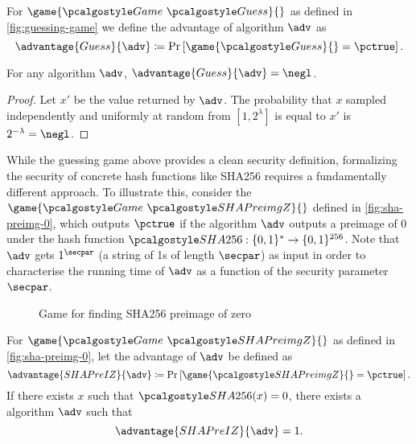 \begin{definition}
  For $\game{\Game~\algo{Guess}}{}$ as defined in \autoref{fig:guessing-game} we define the advantage of algorithm $\adv$ as
 \[
  \advantage{Guess}{\adv} \defeq \pr{\game{\algo{Guess}}{} = \pctrue}.
 \]
\end{definition}

\begin{proposition}\label{prop:guessing-game}
  For any algorithm $\adv$, $\advantage{Guess}{\adv} = \negl$.
\end{proposition}

\begin{proof}
Let $x'$ be the value returned by $\adv$.
The probability that $x$ sampled independently and uniformly at random from $[1, 2^\lambda]$ is equal to $x'$ is $2^{-\lambda} = \negl$.
\end{proof}

While the guessing game above provides a clean security definition, formalizing the security of concrete hash functions like SHA256 requires a fundamentally different approach.
To illustrate this, consider the $\game{\Game~\algo{SHAPreimgZ}}{}$ defined in \autoref{fig:sha-preimg-0}, which outputs $\pctrue$ if the algorithm $\adv$ outputs a preimage of 0 under the hash function $\algo{SHA256}: \{0, 1\}^* \rightarrow \{0, 1\}^{256}$.
Note that $\adv$ gets $1^{\secpar}$ (a string of 1s of length $\secpar$) as input in order to characterise the running time of $\adv$ as a function of the security parameter $\secpar$.

\begin{figure}[tbhp]
  \begin{center}
    \begin{tcolorbox}[width=5cm]
      \begin{pchstack}[center]
      \end{pchstack}
    \end{tcolorbox}
  \end{center}
  \caption{Game for finding SHA256 preimage of zero \label{fig:sha-preimg-0}}
\end{figure}

\begin{proposition}\label{prop:sha-preimg-z}
 For $\game{\Game~\algo{SHAPreimgZ}}{}$ as defined in \autoref{fig:sha-preimg-0}, let the advantage of $\adv$ be defined as
 \[
  \advantage{SHAPreIZ}{\adv} \defeq \pr{\game{\algo{SHAPreimgZ}}{} = \pctrue}.
 \]
 If there exists $x$ such that $\algo{SHA256}(x) = 0$, there exists a \ppt algorithm $\adv$ such that
  \[
  \advantage{SHAPreIZ}{\adv} = 1.
  \]
\end{proposition}

